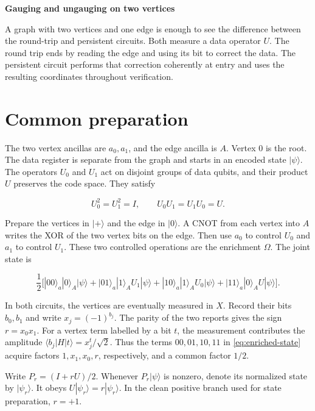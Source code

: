 \documentclass[11pt,a4paper]{article}
\begin{document}
{\LARGE\bfseries Gauging and ungauging on two vertices\par}

A graph with two vertices and one edge is enough to see the difference between
the round-trip and persistent circuits. Both measure a data operator \(U\).
The round trip ends by reading the edge and using its bit to correct the data.
The persistent circuit performs that correction coherently at entry and uses
the resulting coordinates throughout verification.

\section*{Common preparation}

The two vertex ancillas are \(a_0,a_1\), and the edge ancilla is \(A\). Vertex
\(0\) is the root. The data register is separate from the graph and starts in
an encoded state \(|\psi\rangle\). The operators \(U_0\) and \(U_1\) act on
disjoint groups of data qubits, and their product \(U\) preserves the code
space. They satisfy

\[
U_0^2=U_1^2=I,\qquad U_0U_1=U_1U_0=U.
\]

Prepare the vertices in \(|+\rangle\) and the edge in \(|0\rangle\). A CNOT
from each vertex into \(A\) writes the XOR of the two vertex bits on the edge.
Then use \(a_0\) to control \(U_0\) and \(a_1\) to control \(U_1\). These
two controlled operations are the enrichment \(\Omega\). The joint state is

\begin{equation}
\label{eq:enriched-state}
\frac12\Big[
 |00\rangle_a|0\rangle_A|\psi\rangle
+|01\rangle_a|1\rangle_A U_1|\psi\rangle
+|10\rangle_a|1\rangle_A U_0|\psi\rangle
+|11\rangle_a|0\rangle_A U|\psi\rangle
\Big].
\end{equation}

In both circuits, the vertices are eventually measured in \(X\). Record
their bits \(b_0,b_1\) and write \(x_j=(-1)^{b_j}\). The parity of the
two reports gives the sign \(r=x_0x_1\). For a vertex term labelled by
a bit \(t\), the measurement contributes the amplitude
\(\langle b_j|H|t\rangle=x_j^t/\sqrt2\). Thus the terms \(00,01,10,11\)
in \eqref{eq:enriched-state} acquire factors \(1,x_1,x_0,r\), respectively, and a common factor \(1/2\).

Write \(P_r=(I+rU)/2\). Whenever \(P_r|\psi\rangle\) is nonzero, denote its
normalized state by \(|\psi_r\rangle\). It obeys
\(U|\psi_r\rangle=r|\psi_r\rangle\). In the clean positive branch used for
state preparation, \(r=+1\).
\end{document}

